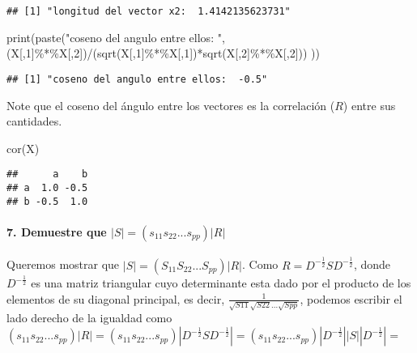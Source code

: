 \documentclass[
]{article}
\newenvironment{Shaded}{\begin{snugshade}}{\end{snugshade}}
\newcommand{\DecValTok}[1]{\textcolor[rgb]{0.00,0.00,0.81}{#1}}
\newcommand{\FunctionTok}[1]{\textcolor[rgb]{0.00,0.00,0.00}{#1}}
\newcommand{\NormalTok}[1]{#1}
\newcommand{\SpecialCharTok}[1]{\textcolor[rgb]{0.00,0.00,0.00}{#1}}
\newcommand{\StringTok}[1]{\textcolor[rgb]{0.31,0.60,0.02}{#1}}
\begin{document}
\begin{verbatim}
## [1] "longitud del vector x2:  1.4142135623731"
\end{verbatim}

\begin{Shaded}
\begin{Highlighting}[]
\FunctionTok{print}\NormalTok{(}\FunctionTok{paste}\NormalTok{(}\StringTok{"coseno del angulo entre ellos: "}\NormalTok{, }
\NormalTok{            (X[,}\DecValTok{1}\NormalTok{]}\SpecialCharTok{\%*\%}\NormalTok{X[,}\DecValTok{2}\NormalTok{])}\SpecialCharTok{/}\NormalTok{(}\FunctionTok{sqrt}\NormalTok{(X[,}\DecValTok{1}\NormalTok{]}\SpecialCharTok{\%*\%}\NormalTok{X[,}\DecValTok{1}\NormalTok{])}\SpecialCharTok{*}\FunctionTok{sqrt}\NormalTok{(X[,}\DecValTok{2}\NormalTok{]}\SpecialCharTok{\%*\%}\NormalTok{X[,}\DecValTok{2}\NormalTok{]))  ))}
\end{Highlighting}
\end{Shaded}

\begin{verbatim}
## [1] "coseno del angulo entre ellos:  -0.5"
\end{verbatim}

Note que el coseno del ángulo entre los vectores es la correlación
(\(R\)) entre sus cantidades.

\begin{Shaded}
\begin{Highlighting}[]
\FunctionTok{cor}\NormalTok{(X)}
\end{Highlighting}
\end{Shaded}

\begin{verbatim}
##      a    b
## a  1.0 -0.5
## b -0.5  1.0
\end{verbatim}

\hypertarget{demuestre-que-s-s_11s_22...s_ppr}{%
\paragraph{\texorpdfstring{7. Demuestre que
\(|S| = (s_{11}s_{22}...s_{pp})|R|\)}{7. Demuestre que \textbar S\textbar{} = (s\_\{11\}s\_\{22\}...s\_\{pp\})\textbar R\textbar{}}}\label{demuestre-que-s-s_11s_22...s_ppr}}

Queremos mostrar que \(|S| = (S_{11}S_{22}...S_{pp})|R|\). Como
\(R = D^{-\frac{1}{2}}S D^{-\frac{1}{2}}\), donde \(D^{-\frac{1}{2}}\)
es una matriz triangular cuyo determinante esta dado por el producto de
los elementos de su diagonal principal, es decir,
\(\frac{1}{\sqrt{S11}\sqrt{S22}...\sqrt{Spp}}\), podemos escribir el
lado derecho de la igualdad como
\((s_{11}s_{22}...s_{pp})|R| = (s_{11}s_{22}...s_{pp})|D^{-\frac{1}{2}}S D^{-\frac{1}{2}}| = (s_{11}s_{22}...s_{pp})|D^{-\frac{1}{2}}||S|| D^{-\frac{1}{2}}|=\)
\end{document}
